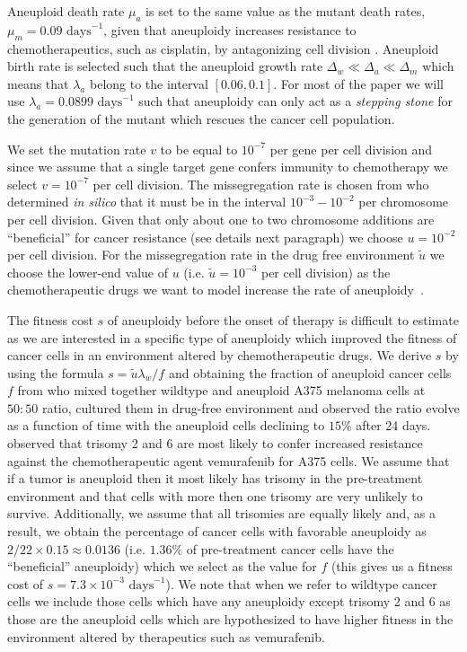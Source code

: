 \documentclass[12pt]{extarticle}
\begin{document}
 Aneuploid death rate $\mu_a$ is set to the same value as the mutant death rates, $\mu_m=0.09\text{ days}^{-1}$, given that aneuploidy increases resistance to chemotherapeutics, such as cisplatin, by antagonizing cell division \citep{replogle2020aneuploidy}. Aneuploid birth rate is selected such that the aneuploid growth rate $\Delta_w\ll\Delta_a\ll\Delta_m$ which means that $\lambda_a$ belong to the interval $\left[0.06,0.1\right]$. For most of the paper we will use $\lambda_a=0.0899\text{ days}^{-1}$ such that aneuploidy can only act as a \emph{stepping stone} for the generation of the mutant which rescues the cancer cell population.

We set the mutation rate $v$ to be equal to $10^{-7}$ per gene per cell division \citep{loeb2001mutator} and since we assume that a single target gene confers immunity to chemotherapy we select $v=10^{-7}$ per cell division. %
The missegregation rate is chosen from \citet{bakker2023predicting} who determined \textit{in silico} that it must be in the interval $10^{-3}-10^{-2}$ per chromosome per cell division. Given that only about one to two chromosome additions are ``beneficial'' for cancer resistance (see details next paragraph) we choose $u=10^{-2}$ per cell division. For the missegregation rate in the drug free environment $\tilde{u}$ we choose the lower-end value of $u$ (i.e.  $\tilde{u}=10^{-3}$ per cell division) as the chemotherapeutic drugs we want to model increase the rate of aneuploidy~\citep{wang2019molecular,mason2017functional}. 

The fitness cost $s$ of aneuploidy before the onset of therapy is difficult to estimate as we are interested in a specific type of aneuploidy which improved the fitness of cancer cells in an environment altered by chemotherapeutic drugs. We derive $s$ by using the formula $s=\tilde{u}\lambda_w/f$ and obtaining the fraction of aneuploid cancer cells $f$ from \citep{lukow2021chromosomal} who mixed together wildtype and aneuploid A375 melanoma cells at $50:50$ ratio, cultured them in drug-free environment and observed the ratio evolve as a function of time with the aneuploid cells declining to $15\%$ after 24 days. \citet{ippolito2021gene} observed that trisomy 2 and 6 are most likely to confer increased resistance against the chemotherapeutic agent vemurafenib for A375 cells. We assume that if a tumor is aneuploid then it most likely has trisomy \citep{gisselsson2010generation} in the pre-treatment environment and that cells with more then one trisomy are very unlikely to survive. Additionally, we assume that all trisomies are equally likely and, as a result, we obtain the percentage of cancer cells with favorable aneuploidy as $2/22\times0.15\approx 0.0136$ (i.e. $1.36\%$ of pre-treatment cancer cells have the ``beneficial'' aneuploidy) which we select as the value for $f$ (this gives us a fitness cost of $s= 7.3\times10^{-3}\text{ days}^{-1}$). We note that when we refer to wildtype cancer cells we include those cells which have any aneuploidy except trisomy 2 and 6 as those are the aneuploid cells which are hypothesized to have higher fitness in the environment altered by therapeutics such as vemurafenib.
\end{document}
